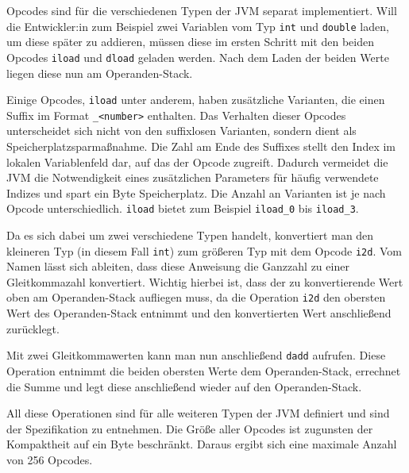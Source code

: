 Opcodes sind für die verschiedenen Typen der JVM separat implementiert. Will die Entwickler:in zum Beispiel zwei Variablen vom Typ \texttt{int} und \texttt{double} laden, um diese später zu addieren, müssen diese im ersten Schritt mit den beiden Opcodes \texttt{iload} und \texttt{dload} geladen werden. Nach dem Laden der beiden Werte liegen diese nun am Operanden-Stack.

Einige Opcodes, \texttt{iload} unter anderem, haben zusätzliche Varianten, die einen Suffix im Format \texttt{\_<number>} enthalten. Das Verhalten dieser Opcodes unterscheidet sich nicht von den suffixlosen Varianten, sondern dient als Speicherplatzsparmaßnahme. Die Zahl am Ende des Suffixes stellt den Index im lokalen Variablenfeld dar, auf das der Opcode zugreift. Dadurch vermeidet die JVM die Notwendigkeit eines zusätzlichen Parameters für häufig verwendete Indizes und spart ein Byte Speicherplatz.  Die Anzahl an Varianten ist je nach Opcode unterschiedlich. \texttt{iload} bietet zum Beispiel \texttt{iload\_0} bis \texttt{iload\_3}. 

Da es sich dabei um zwei verschiedene Typen handelt, konvertiert man den kleineren Typ (in diesem Fall \texttt{int}) zum größeren Typ mit dem Opcode \texttt{i2d}. Vom Namen lässt sich ableiten, dass diese Anweisung die Ganzzahl zu einer Gleitkommazahl konvertiert. Wichtig hierbei ist, dass der zu konvertierende Wert oben am Operanden-Stack aufliegen muss, da die Operation \texttt{i2d} den obersten Wert des Operanden-Stack entnimmt und den konvertierten Wert anschließend zurücklegt.

Mit zwei Gleitkommawerten kann man nun anschließend \texttt{dadd} aufrufen. Diese Operation entnimmt die beiden obersten Werte dem Operanden-Stack, errechnet die Summe und legt diese anschließend wieder auf den Operanden-Stack.

All diese Operationen sind für alle weiteren Typen der JVM definiert und sind der Spezifikation zu entnehmen. Die Größe aller Opcodes ist zugunsten der Kompaktheit auf ein Byte beschränkt. Daraus ergibt sich eine maximale Anzahl von 256 Opcodes.